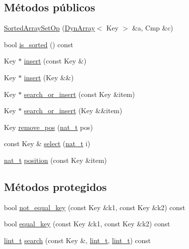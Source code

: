 \subsection*{Métodos públicos}
\begin{DoxyCompactItemize}
\item 
\hyperlink{class_designar_1_1_sorted_array_set_op_a2d732318892f21ead8d988b5a76a016b}{Sorted\+Array\+Set\+Op} (\hyperlink{class_designar_1_1_dyn_array}{Dyn\+Array}$<$ Key $>$ \&a, Cmp \&c)
\item 
bool \hyperlink{class_designar_1_1_sorted_array_set_op_aa11c07509319e513a6f8dd0f3ab7663a}{is\+\_\+sorted} () const
\item 
Key $\ast$ \hyperlink{class_designar_1_1_sorted_array_set_op_aa23273a531de4a184c6a0bdf30816c79}{insert} (const Key \&)
\item 
Key $\ast$ \hyperlink{class_designar_1_1_sorted_array_set_op_a78058ddfd47003fc67d8a87068c5fc78}{insert} (Key \&\&)
\item 
Key $\ast$ \hyperlink{class_designar_1_1_sorted_array_set_op_a4daae3c1bd56ec08a02ce5a5f231aade}{search\+\_\+or\+\_\+insert} (const Key \&item)
\item 
Key $\ast$ \hyperlink{class_designar_1_1_sorted_array_set_op_ad0299c41514cf11f5a418b9e46994580}{search\+\_\+or\+\_\+insert} (Key \&\&item)
\item 
Key \hyperlink{class_designar_1_1_sorted_array_set_op_aa0ea019290a9b4a4777b5beb4c4d0c7d}{remove\+\_\+pos} (\hyperlink{namespace_designar_aa72662848b9f4815e7bf31a7cf3e33d1}{nat\+\_\+t} pos)
\item 
const Key \& \hyperlink{class_designar_1_1_sorted_array_set_op_ad08d29cf21ed0afa0e59ab86fb171108}{select} (\hyperlink{namespace_designar_aa72662848b9f4815e7bf31a7cf3e33d1}{nat\+\_\+t} i)
\item 
\hyperlink{namespace_designar_aa72662848b9f4815e7bf31a7cf3e33d1}{nat\+\_\+t} \hyperlink{class_designar_1_1_sorted_array_set_op_a138b326d0002cf3ddc19a980b1ca9542}{position} (const Key \&item)
\end{DoxyCompactItemize}
\subsection*{Métodos protegidos}
\begin{DoxyCompactItemize}
\item 
bool \hyperlink{class_designar_1_1_sorted_array_set_op_a27beb3e6b8f6b83c6efa46c38e8d22f9}{not\+\_\+equal\+\_\+key} (const Key \&k1, const Key \&k2) const
\item 
bool \hyperlink{class_designar_1_1_sorted_array_set_op_adef257a4a2debcef385f570b1cd72037}{equal\+\_\+key} (const Key \&k1, const Key \&k2) const
\item 
\hyperlink{namespace_designar_a9d113d66a39e82b73727c72cd3a52f73}{lint\+\_\+t} \hyperlink{class_designar_1_1_sorted_array_set_op_ab0dc92fe501e3349041aaafea39a6526}{search} (const Key \&, \hyperlink{namespace_designar_a9d113d66a39e82b73727c72cd3a52f73}{lint\+\_\+t}, \hyperlink{namespace_designar_a9d113d66a39e82b73727c72cd3a52f73}{lint\+\_\+t}) const
\end{DoxyCompactItemize}


